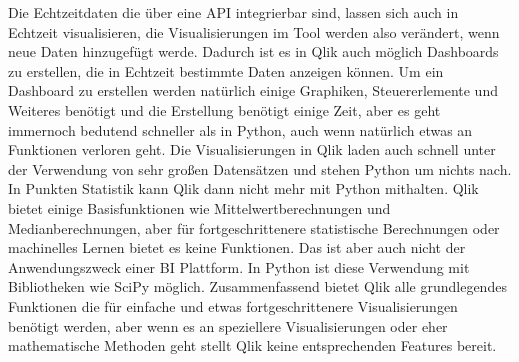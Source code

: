 \documentclass[12pt]{article}
\begin{document}
	Die Echtzeitdaten die über eine API integrierbar sind, lassen sich auch in Echtzeit visualisieren, die Visualisierungen im Tool werden also verändert, wenn neue Daten hinzugefügt werde. Dadurch ist es in Qlik auch möglich Dashboards zu erstellen, die in Echtzeit bestimmte Daten anzeigen können. Um ein Dashboard zu erstellen werden natürlich einige Graphiken, Steuererlemente und Weiteres benötigt und die Erstellung benötigt einige Zeit, aber es geht immernoch bedutend schneller als in Python, auch wenn natürlich etwas an Funktionen verloren geht.
	Die Visualisierungen in Qlik laden auch schnell unter der Verwendung von sehr großen Datensätzen und stehen Python um nichts nach.
	In Punkten Statistik kann Qlik dann nicht mehr mit Python mithalten. Qlik bietet einige Basisfunktionen wie Mittelwertberechnungen und Medianberechnungen, aber für fortgeschrittenere statistische Berechnungen oder machinelles Lernen bietet es keine Funktionen. Das ist aber auch nicht der Anwendungszweck einer BI Plattform. In Python ist diese Verwendung mit Bibliotheken wie SciPy möglich.
	Zusammenfassend bietet Qlik alle grundlegendes Funktionen die für einfache und etwas fortgeschrittenere Visualisierungen benötigt werden, aber wenn es an speziellere Visualisierungen oder eher mathematische Methoden geht stellt Qlik keine entsprechenden Features bereit.
	
\end{document}
